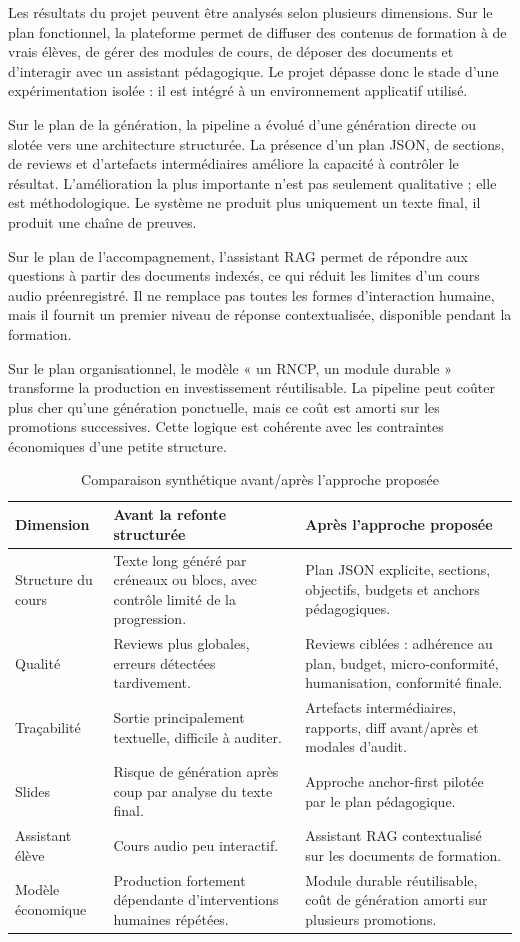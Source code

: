 \documentclass[12pt,a4paper]{article}
\begin{document}
Les résultats du projet peuvent être analysés selon plusieurs dimensions. Sur le plan
fonctionnel, la plateforme permet de diffuser des contenus de formation à de vrais élèves,
de gérer des modules de cours, de déposer des documents et d'interagir avec un assistant
pédagogique. Le projet dépasse donc le stade d'une expérimentation isolée : il est intégré
à un environnement applicatif utilisé.

Sur le plan de la génération, la pipeline a évolué d'une génération directe ou slotée vers
une architecture structurée. La présence d'un plan JSON, de sections, de reviews et
d'artefacts intermédiaires améliore la capacité à contrôler le résultat. L'amélioration la
plus importante n'est pas seulement qualitative ; elle est méthodologique. Le système ne
produit plus uniquement un texte final, il produit une chaîne de preuves.

Sur le plan de l'accompagnement, l'assistant RAG permet de répondre aux questions à
partir des documents indexés, ce qui réduit les limites d'un cours audio préenregistré. Il
ne remplace pas toutes les formes d'interaction humaine, mais il fournit un premier niveau
de réponse contextualisée, disponible pendant la formation.

Sur le plan organisationnel, le modèle « un RNCP, un module durable » transforme la
production en investissement réutilisable. La pipeline peut coûter plus cher qu'une
génération ponctuelle, mais ce coût est amorti sur les promotions successives. Cette
logique est cohérente avec les contraintes économiques d'une petite structure.

\begin{table}[h]
\centering
\small
\begin{tabular}{|p{3.3cm}|p{4.4cm}|p{4.4cm}|}
\hline
\textbf{Dimension} & \textbf{Avant la refonte structurée} & \textbf{Après l'approche proposée} \\
\hline
Structure du cours &
Texte long généré par créneaux ou blocs, avec contrôle limité de la progression. &
Plan JSON explicite, sections, objectifs, budgets et anchors pédagogiques. \\
\hline
Qualité &
Reviews plus globales, erreurs détectées tardivement. &
Reviews ciblées : adhérence au plan, budget, micro-conformité, humanisation, conformité finale. \\
\hline
Traçabilité &
Sortie principalement textuelle, difficile à auditer. &
Artefacts intermédiaires, rapports, diff avant/après et modales d'audit. \\
\hline
Slides &
Risque de génération après coup par analyse du texte final. &
Approche anchor-first pilotée par le plan pédagogique. \\
\hline
Assistant élève &
Cours audio peu interactif. &
Assistant RAG contextualisé sur les documents de formation. \\
\hline
Modèle économique &
Production fortement dépendante d'interventions humaines répétées. &
Module durable réutilisable, coût de génération amorti sur plusieurs promotions. \\
\hline
\end{tabular}
\caption{Comparaison synthétique avant/après l'approche proposée}
\end{table}
\end{document}
